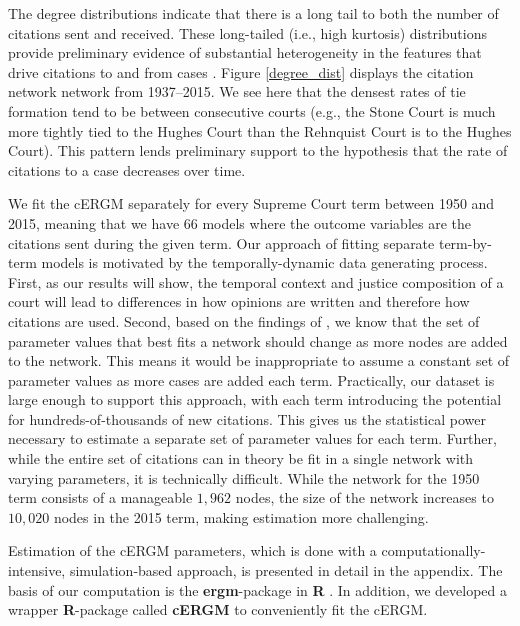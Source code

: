 \documentclass{cup-pan}
\begin{document}
The degree distributions indicate that there is a long tail to both the number of citations sent and received. These long-tailed (i.e., high kurtosis) distributions provide preliminary evidence of substantial heterogeneity in the features that drive citations to and from cases \citep{strogatz2001exploring}. Figure \ref{degree_dist} displays the citation network network from 1937--2015. We see here that the densest rates of tie formation tend to be between consecutive courts (e.g., the Stone Court is much more tightly tied to the Hughes Court than the Rehnquist Court is to the Hughes Court). This pattern lends preliminary support to the hypothesis that the rate of citations to a case decreases over time.



We fit the cERGM separately for every Supreme Court term between 1950 and 2015, meaning that we have 66 models where the outcome variables are the citations sent during the given term. Our approach of fitting separate term-by-term models is motivated by the temporally-dynamic data generating process. First, as our results will show, the temporal context and justice composition of a court will lead to differences in how opinions are written and therefore how citations are used. Second, based on the findings of \citet{shalizi2013consistency}, we know that the set of parameter values that best fits a network should change as more nodes are added to the network. This means it would be inappropriate to assume a constant set of parameter values as more cases are added each term. Practically, our dataset is large enough to support this approach, with each term introducing the potential for hundreds-of-thousands of new citations. This gives us the statistical power necessary to estimate a separate set of parameter values for each term. Further, while the entire set of citations can in theory be fit in a single network with varying parameters, it is technically difficult. While the network for the 1950 term consists of a manageable $1,962$ nodes, the size of the network increases to $10,020$ nodes in the 2015 term, making estimation more challenging. 

Estimation of the cERGM parameters, which is done with a computationally-intensive, simulation-based approach, is presented in detail in the appendix. The basis of our computation is the \textbf{ergm}-package \citep{HunterDavidR..2008} in \textbf{R} \citep{RCore}. In addition, we developed a wrapper \textbf{R}-package called \textbf{cERGM} \citep{cergm} to conveniently fit the cERGM.
\end{document}
